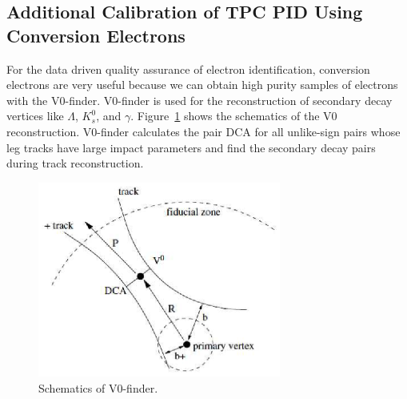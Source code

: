 {{\subsection{Additional Calibration of TPC PID Using Conversion Electrons}
\label{sec_4_convpid}
For the data driven quality assurance of electron identification, conversion electrons are very useful because we can obtain high purity samples of electrons with the V0-finder.
V0-finder is used for the reconstruction of secondary decay vertices like $\Lambda$, $K^{0}_{s}$, and $\gamma$. 
Figure~\ref{fig_4_v0finder} shows the schematics of the V0 reconstruction. 
V0-finder calculates the pair DCA for all unlike-sign pairs whose leg tracks have large impact parameters and find the secondary decay pairs during track reconstruction. 
\begin{figure}[!h]
  \centering
  \includegraphics[width=8cm]{chap4/figure/PID/v0-finder.eps}
  \caption{Schematics of V0-finder. }
  \label{fig_4_v0finder}
\end{figure}

}}
